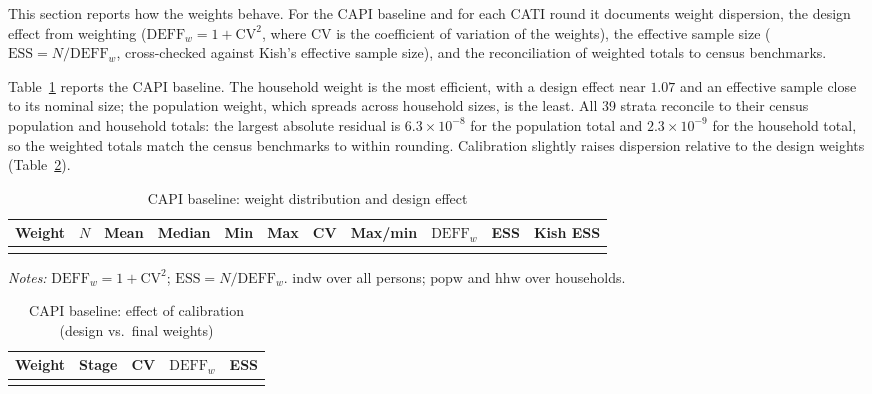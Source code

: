 \documentclass[AEJ]{AEA}
\begin{document}
This section reports how the weights behave. For the CAPI baseline and for each
CATI round it documents weight dispersion, the design effect from weighting
($\mathrm{DEFF}_w = 1 + \mathrm{CV}^2$, where CV is the coefficient of variation of
the weights), the effective sample size ($\mathrm{ESS} = N / \mathrm{DEFF}_w$,
cross-checked against Kish's effective sample size), and the reconciliation of
weighted totals to census benchmarks.

Table~\ref{tab:capidist} reports the CAPI baseline. The household weight is the
most efficient, with a design effect near $1.07$ and an effective sample close to
its nominal size; the population weight, which spreads across household sizes, is
the least. All 39 strata reconcile to their census population and household totals:
the largest absolute residual is $6.3\times 10^{-8}$ for the population total and
$2.3\times 10^{-9}$ for the household total, so the weighted totals match the
census benchmarks to within rounding. Calibration slightly raises dispersion
relative to the design weights (Table~\ref{tab:caleffect}).

\begin{table}[!t]
\raggedright
\begin{threeparttable}
\caption{CAPI baseline: weight distribution and design effect}
\label{tab:capidist}
\footnotesize
\setlength{\tabcolsep}{4pt}
\begin{tabular}{@{}l r r r r r r r r r r@{}}
\toprule
Weight & $N$ & Mean & Median & Min & Max & CV & Max/min & $\mathrm{DEFF}_w$ & ESS & Kish ESS \\
\midrule
\\
\bottomrule
\end{tabular}
\begin{tablenotes}\notesize
\item \textit{Notes:} $\mathrm{DEFF}_w = 1+\mathrm{CV}^2$; $\mathrm{ESS}=N/\mathrm{DEFF}_w$.
$\mathrm{indw}$ over all persons; $\mathrm{popw}$ and $\mathrm{hhw}$ over households.
\end{tablenotes}
\end{threeparttable}
\end{table}

\begin{table}[!t]
\raggedright
\begin{threeparttable}
\caption{CAPI baseline: effect of calibration (design vs.\ final weights)}
\label{tab:caleffect}
\footnotesize
\begin{tabular}{@{}l l r r r@{}}
\toprule
Weight & Stage & CV & $\mathrm{DEFF}_w$ & ESS \\
\midrule
\\
\bottomrule
\end{tabular}
\end{threeparttable}
\end{table}
\end{document}
